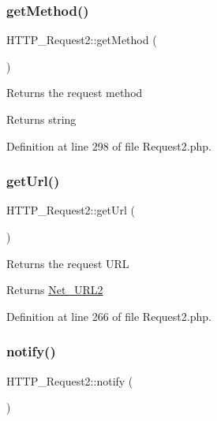 \subsubsection{\texorpdfstring{get\+Method()}{getMethod()}}
{\footnotesize\ttfamily H\+T\+T\+P\+\_\+\+Request2\+::get\+Method (\begin{DoxyParamCaption}{ }\end{DoxyParamCaption})}

Returns the request method

\begin{DoxyReturn}{Returns}
string 
\end{DoxyReturn}


Definition at line 298 of file Request2.\+php.

\hypertarget{classHTTP__Request2_a35d9ef6e266d90ad52a5037b70850694}{}\label{classHTTP__Request2_a35d9ef6e266d90ad52a5037b70850694} 
\subsubsection{\texorpdfstring{get\+Url()}{getUrl()}}
{\footnotesize\ttfamily H\+T\+T\+P\+\_\+\+Request2\+::get\+Url (\begin{DoxyParamCaption}{ }\end{DoxyParamCaption})}

Returns the request U\+RL

\begin{DoxyReturn}{Returns}
\hyperlink{classNet__URL2}{Net\+\_\+\+U\+R\+L2} 
\end{DoxyReturn}


Definition at line 266 of file Request2.\+php.

\hypertarget{classHTTP__Request2_af35a8a6eb99219760dddd6223599a8ef}{}\label{classHTTP__Request2_af35a8a6eb99219760dddd6223599a8ef} 
\subsubsection{\texorpdfstring{notify()}{notify()}}
{\footnotesize\ttfamily H\+T\+T\+P\+\_\+\+Request2\+::notify (\begin{DoxyParamCaption}{ }\end{DoxyParamCaption})}

